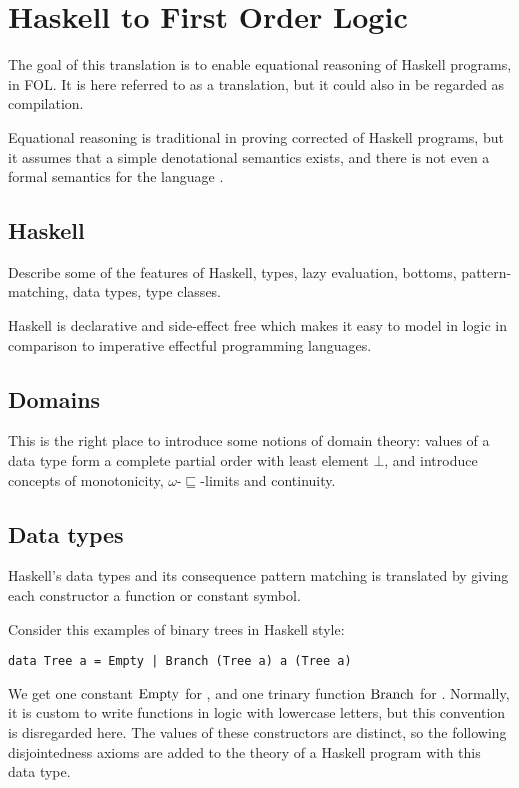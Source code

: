 \chapter{Haskell to First Order Logic}

The goal of this translation is to enable equational reasoning of
Haskell programs, in FOL. It is here referred to as a translation, but
it could also in be regarded as compilation.

Equational reasoning is traditional in proving corrected of Haskell
programs, but it assumes that a simple denotational semantics exists,
and there is not even a formal semantics for the language
\cite{chasingbot}.

\section{Haskell}

Describe some of the features of Haskell, types, lazy evaluation,
bottoms, pattern-matching, data types, type classes.

Haskell is declarative and side-effect free which makes it easy
to model in logic in comparison to imperative effectful programming languages.

\section{Domains}

This is the right place to introduce some notions of domain theory:
values of a data type form a complete partial order with least element
$\bot$, and introduce concepts of monotonicity,
$\omega$-$\sqsubseteq$-limits and continuity.

\section{Data types}
\label{sec:treetrans}

Haskell's data types and its consequence pattern matching is
translated by giving each constructor a function or constant symbol.

Consider this examples of binary trees in Haskell style:

\begin{verbatim}
data Tree a = Empty | Branch (Tree a) a (Tree a)
\end{verbatim}

We get one constant $\mathrm{Empty}$ for , and one trinary
function $\mathrm{Branch}$ for . Normally, it is custom
to write functions in logic with lowercase letters, but this
convention is disregarded here. The values of these constructors are
distinct, so the following disjointedness axioms are added to the
theory of a Haskell program with this data type.


